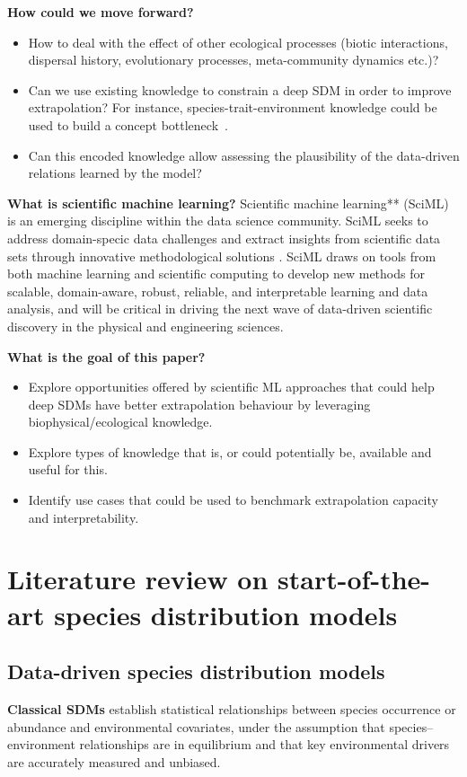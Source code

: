 \noindent\textbf{How could we move forward?}
\begin{itemize}
\item How to deal with the effect of other ecological processes (biotic interactions, dispersal history, evolutionary processes, meta-community dynamics etc.)?
\item Can we use existing knowledge to constrain a deep SDM in order to improve extrapolation? For instance, species-trait-environment knowledge could be used to build a concept bottleneck~\cite{koh2020concept}. 
\item Can this encoded knowledge allow assessing the plausibility of the data-driven relations learned by the model?
\end{itemize}

\noindent\textbf{What is scientific machine learning?}
Scientific machine learning** (SciML) is an emerging discipline within the data science community.  SciML seeks to address domain-specic data challenges and extract insights from scientific data sets through innovative methodological solutions \cite{rackauckas2020}. SciML draws on tools from both machine learning and scientific computing to develop new methods for scalable, domain-aware, robust, reliable, and interpretable learning and data analysis, and will be critical in driving the next wave of data-driven scientific discovery in the physical and engineering sciences. 

\noindent\textbf{What is the goal of this paper?} 
\begin{itemize}
    \item Explore opportunities offered by scientific ML approaches that could help deep SDMs have better extrapolation behaviour by leveraging biophysical/ecological knowledge.
    \item Explore types of knowledge that is, or could potentially be, available and useful for this.
    \item Identify use cases that could be used to benchmark extrapolation capacity and interpretability.
\end{itemize}

\section{Literature review on start-of-the-art species distribution models}

\subsection{Data-driven species distribution models}
\noindent\textbf{Classical SDMs}
 establish statistical relationships between species occurrence or abundance and environmental covariates, under the assumption that species–environment relationships are in equilibrium and that key environmental drivers are accurately measured and unbiased. 

